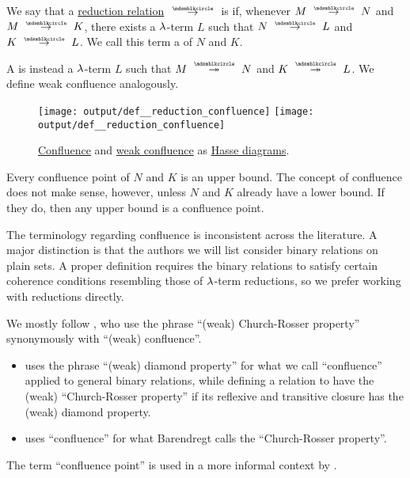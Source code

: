 \begin{definition}\label{def:reduction_confluence}
  We say that a \hyperref[def:lambda_term_reduction]{reduction relation} \( {\pred} \) is  if, whenever \( M \pred N \) and \( M \pred K \), there exists a \( {\mathrm \lambda} \)-term \( L \) such that \( N \pred L \) and \( K \pred L \). We call this term a   of \( N \) and \( K \).

  A  is instead a \( {\mathrm \lambda} \)-term \( L \) such that \( M \pred* N \) and \( K \pred* L \). We define weak confluence analogously.

  \begin{figure}[!ht]
    \hfill
    \texttt{[image: output/def\_\_reduction\_confluence]}
    \hfill
    \texttt{[image: output/def\_\_reduction\_confluence]}
    \hfill
    \hfill
    \caption{\hyperref[def:reduction_confluence]{Confluence} and \hyperref[def:reduction_confluence]{weak confluence} as \hyperref[def:hasse_diagram]{Hasse diagrams}.}\label{fig:def:relation_confluence}
  \end{figure}
\end{definition}
\begin{comments}
  \item Every confluence point of \( N \) and \( K \) is an upper bound. The concept of confluence does not make sense, however, unless \( N \) and \( K \) already have a lower bound. If they do, then any upper bound is a confluence point.

  \item The terminology regarding confluence is inconsistent across the literature. A major distinction is that the authors we will list consider binary relations on plain sets. A proper definition requires the binary relations to satisfy certain coherence conditions resembling those of \( {\mathrm \lambda} \)-term reductions, so we prefer working with reductions directly.

  We mostly follow , who use the phrase \enquote{(weak) Church-Rosser property} synonymously with \enquote{(weak) confluence}.
  \begin{itemize}
    \item {} uses the phrase \enquote{(weak) diamond property} for what we call \enquote{confluence} applied to general binary relations, while defining a relation to have the (weak) \enquote{Church-Rosser property} if its reflexive and transitive closure has the (weak) diamond property.

    \item {} uses \enquote{confluence} for what Barendregt calls the \enquote{Church-Rosser property}.
  \end{itemize}

  The term \enquote{confluence point} is used in a more informal context by .
\end{comments}

